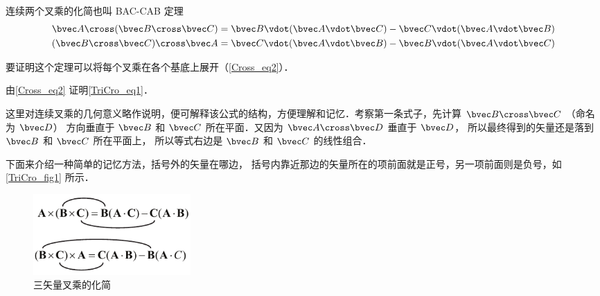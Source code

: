 

连续两个叉乘的化简也叫 BAC-CAB 定理
\begin{gather}
\bvec A \cross (\bvec B \cross \bvec C) = \bvec B \vdot (\bvec A \vdot \bvec C) - \bvec C \vdot (\bvec A \vdot \bvec B)\label{TriCro_eq1}\\
(\bvec B \cross \bvec C) \cross \bvec A = \bvec C \vdot (\bvec A \vdot \bvec B) - \bvec B \vdot (\bvec A \vdot \bvec C)
\end{gather}

要证明这个定理可以将每个叉乘在各个基底上展开（\autoref{Cross_eq2}）．

\begin{exer}{}
由\autoref{Cross_eq2} 证明\autoref{TriCro_eq1}．
\end{exer} 

这里对连续叉乘的几何意义略作说明，便可解释该公式的结构，方便理解和记忆．考察第一条式子，先计算 $\bvec B \cross \bvec C$ （命名为 $\bvec D$） 方向垂直于 $\bvec B$ 和 $\bvec C$ 所在平面．又因为 $\bvec A \cross \bvec D$ 垂直于 $\bvec D$， 所以最终得到的矢量还是落到 $\bvec B$ 和 $\bvec C$ 所在平面上， 所以等式右边是 $\bvec B$ 和 $\bvec C$ 的线性组合．

下面来介绍一种简单的记忆方法，括号外的矢量在哪边， 括号内靠近那边的矢量所在的项前面就是正号，另一项前面则是负号，如\autoref{TriCro_fig1} 所示．

\begin{figure}[ht]
\centering
\includegraphics[width=6cm]{./figures/TriCro1.pdf}
\caption{三矢量叉乘的化简}\label{TriCro_fig1}
\end{figure}